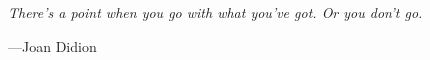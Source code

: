 \documentclass{book}
\begin{document}

\pagestyle{empty}




\newpage
\thispagestyle{empty} %

\setlength\epigraphrule{0pt}
\setlength{}

\null
\vspace{20ex}



\epigraph{\itshape
  There’s a point when you go with what you’ve got. Or you don’t go.
}{
  ---Joan Didion
}






\cleardoublepage

\pagestyle{headings}

\setcounter{page}{1} %
\setcounter{tocdepth}{1}

\tableofcontents
{}


\newpage


\newpage
\end{document}
